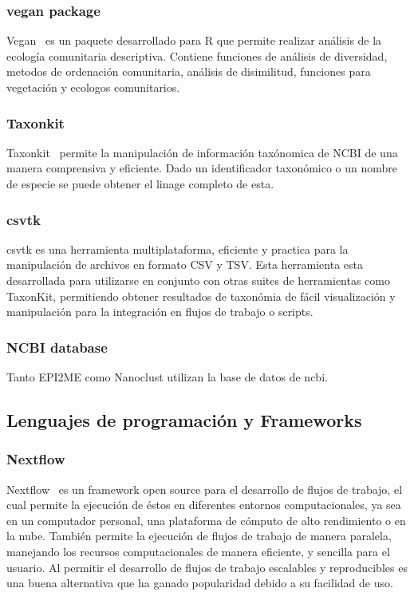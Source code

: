 \subsubsection{vegan package}
Vegan~\cite{dixon2003vegan} es un paquete desarrollado para R que permite realizar análisis de la ecología comunitaria descriptiva. Contiene funciones de análisis de diversidad,  metodos de ordenación comunitaria, análisis de disimilitud, funciones para vegetación y ecologos comunitarios.



\subsubsection{Taxonkit}
Taxonkit~\cite{SHEN2021844} permite la manipulación de información taxónomica de NCBI de una manera comprensiva y eficiente. Dado un identificador taxonómico o un nombre de especie se puede obtener el linage completo de esta.

\subsubsection{csvtk}
csvtk es una herramienta multiplataforma, eficiente y practica para la manipulación de archivos en formato CSV y TSV. Esta herramienta esta desarrollada para utilizarse en conjunto con otras suites de herramientas como TaxonKit, permitiendo obtener resultados de taxonómia de fácil visualización y manipulación para la integración en flujos de trabajo o scripts.
\subsubsection{NCBI database}
Tanto EPI2ME como Nanoclust utilizan la base de datos de ncbi.
\subsection{Lenguajes de programación y Frameworks}
\subsubsection{Nextflow}
Nextflow~\cite{di2017nextflow} es un framework open source para el desarrollo de flujos de trabajo, el cual permite la ejecución de éstos en diferentes entornos computacionales, ya sea en un computador personal, una plataforma de cómputo de alto rendimiento o en la nube. También permite la ejecución de flujos de trabajo de manera paralela, manejando los recursos computacionales de manera eficiente, y sencilla para el usuario.
 Al permitir el desarrollo de flujos de trabajo escalables y reproducibles es una buena alternativa que ha ganado popularidad debido a su facilidad de uso.

